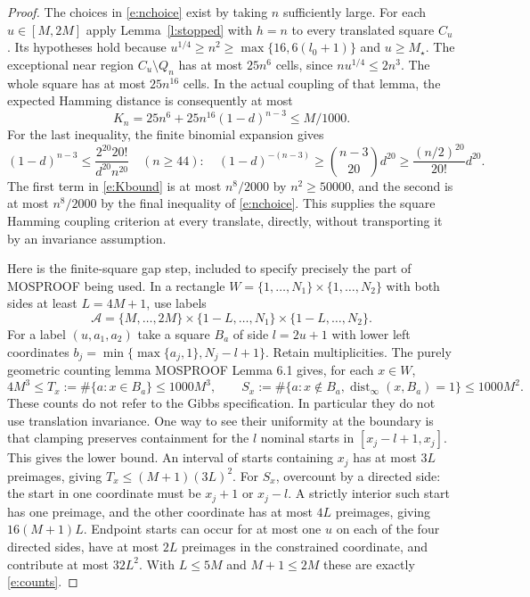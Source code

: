 \documentclass[11pt,reqno]{amsart}
\theoremstyle{definition}
\newcommand{\dist}{\operatorname{dist}_\infty}
\begin{document}
\begin{proof}
The choices in \eqref{e:nchoice} exist by taking $n$ sufficiently large.
For each $u\in[M,2M]$ apply Lemma~\ref{l:stopped} with $h=n$ to every
translated square $C_u$. Its hypotheses hold because
$u^{1/4}\ge n^2\ge\max\{16,6(l_0+1)\}$ and $u\ge M_\star$.
The exceptional near region $C_u\setminus Q_n$ has at most $25n^6$
cells, since $nu^{1/4}\le2n^3$. The whole square has at most $25n^{16}$
cells. In the actual coupling of that lemma, the expected Hamming
distance is consequently at most
\begin{equation}\label{e:Kbound}
 K_n=25n^6+25n^{16}(1-d)^{n-3}\le M/1000.
\end{equation}
For the last inequality, the finite binomial expansion gives
\[
 (1-d)^{n-3}\le\frac{2^{20}20!}{d^{20}n^{20}}\quad(n\ge44):
 \quad (1-d)^{-(n-3)}\ge\binom{n-3}{20}d^{20}
                         \ge\frac{(n/2)^{20}}{20!}d^{20}.
\]
The first term in \eqref{e:Kbound} is at most $n^8/2000$ by
$n^2\ge50000$, and the second is at most $n^8/2000$ by the final
inequality of \eqref{e:nchoice}. This supplies the square Hamming
coupling criterion at every translate, directly, without transporting
it by an invariance assumption.

Here is the finite-square gap step, included to specify precisely the
part of MOSPROOF being used. In a rectangle
$W=\{1,\ldots,N_1\}\times\{1,\ldots,N_2\}$ with both sides at least
$L=4M+1$, use labels
\[
 \mathcal A=\{M,\ldots,2M\}\times\{1-L,\ldots,N_1\}
                        \times\{1-L,\ldots,N_2\}.
\]
For a label $(u,a_1,a_2)$ take a square $B_a$ of side $l=2u+1$ with
lower left coordinates
$b_j=\min\{\max\{a_j,1\},N_j-l+1\}$. Retain multiplicities.
The purely geometric counting lemma MOSPROOF Lemma 6.1 gives, for
each $x\in W$,
\begin{equation}\label{e:counts}
 4M^3\le T_x:=\#\{a:x\in B_a\}\le1000M^3,\qquad
 S_x:=\#\{a:x\notin B_a,\dist(x,B_a)=1\}\le1000M^2.
\end{equation}
These counts do not refer to the Gibbs specification. In particular
they do not use translation invariance. One way to see their uniformity
at the boundary is that clamping preserves containment for the $l$
nominal starts in $[x_j-l+1,x_j]$. This gives the lower bound.
An interval of starts containing $x_j$ has at most $3L$ preimages,
giving $T_x\le(M+1)(3L)^2$. For $S_x$, overcount by a directed side:
the start in one coordinate must be $x_j+1$ or $x_j-l$. A strictly
interior such start has one preimage, and the other coordinate has at
most $4L$ preimages, giving $16(M+1)L$. Endpoint starts can occur for
at most one $u$ on each of the four directed sides, have at most $2L$
preimages in the constrained coordinate, and contribute at most
$32L^2$. With $L\le5M$ and $M+1\le2M$ these are exactly
\eqref{e:counts}.


\end{proof}
\end{document}
